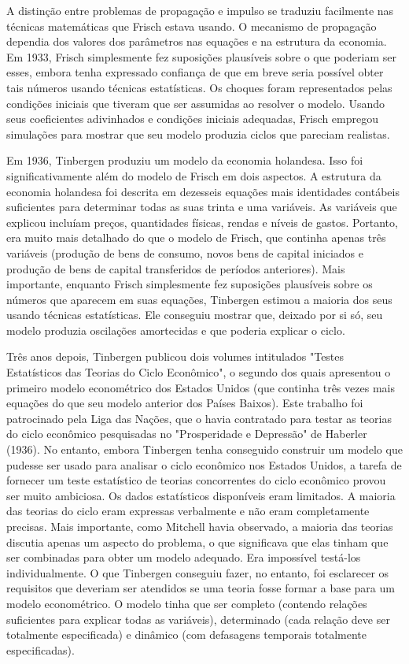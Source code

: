 \documentclass[12pt]{article}
\begin{document}
A distinção entre problemas de propagação e impulso se traduziu facilmente nas técnicas matemáticas que Frisch estava usando. O mecanismo de propagação dependia dos valores dos parâmetros nas equações e na estrutura da economia. Em 1933, Frisch simplesmente fez suposições plausíveis sobre o que poderiam ser esses, embora tenha expressado confiança de que em breve seria possível obter tais números usando técnicas estatísticas. Os choques foram representados pelas condições iniciais que tiveram que ser assumidas ao resolver o modelo. Usando seus coeficientes adivinhados e condições iniciais adequadas, Frisch empregou simulações para mostrar que seu modelo produzia ciclos que pareciam realistas.

Em 1936, Tinbergen produziu um modelo da economia holandesa. Isso foi significativamente além do modelo de Frisch em dois aspectos. A estrutura da economia holandesa foi descrita em dezesseis equações mais identidades contábeis suficientes para determinar todas as suas trinta e uma variáveis. As variáveis que explicou incluíam preços, quantidades físicas, rendas e níveis de gastos. Portanto, era muito mais detalhado do que o modelo de Frisch, que continha apenas três variáveis (produção de bens de consumo, novos bens de capital iniciados e produção de bens de capital transferidos de períodos anteriores). Mais importante, enquanto Frisch simplesmente fez suposições plausíveis sobre os números que aparecem em suas equações, Tinbergen estimou a maioria dos seus usando técnicas estatísticas. Ele conseguiu mostrar que, deixado por si só, seu modelo produzia oscilações amortecidas e que poderia explicar o ciclo.

Três anos depois, Tinbergen publicou dois volumes intitulados "Testes Estatísticos das Teorias do Ciclo Econômico", o segundo dos quais apresentou o primeiro modelo econométrico dos Estados Unidos (que continha três vezes mais equações do que seu modelo anterior dos Países Baixos). Este trabalho foi patrocinado pela Liga das Nações, que o havia contratado para testar as teorias do ciclo econômico pesquisadas no "Prosperidade e Depressão" de Haberler (1936). No entanto, embora Tinbergen tenha conseguido construir um modelo que pudesse ser usado para analisar o ciclo econômico nos Estados Unidos, a tarefa de fornecer um teste estatístico de teorias concorrentes do ciclo econômico provou ser muito ambiciosa. Os dados estatísticos disponíveis eram limitados. A maioria das teorias do ciclo eram expressas verbalmente e não eram completamente precisas. Mais importante, como Mitchell havia observado, a maioria das teorias discutia apenas um aspecto do problema, o que significava que elas tinham que ser combinadas para obter um modelo adequado. Era impossível testá-los individualmente. O que Tinbergen conseguiu fazer, no entanto, foi esclarecer os requisitos que deveriam ser atendidos se uma teoria fosse formar a base para um modelo econométrico. O modelo tinha que ser completo (contendo relações suficientes para explicar todas as variáveis), determinado (cada relação deve ser totalmente especificada) e dinâmico (com defasagens temporais totalmente especificadas).
\end{document}
